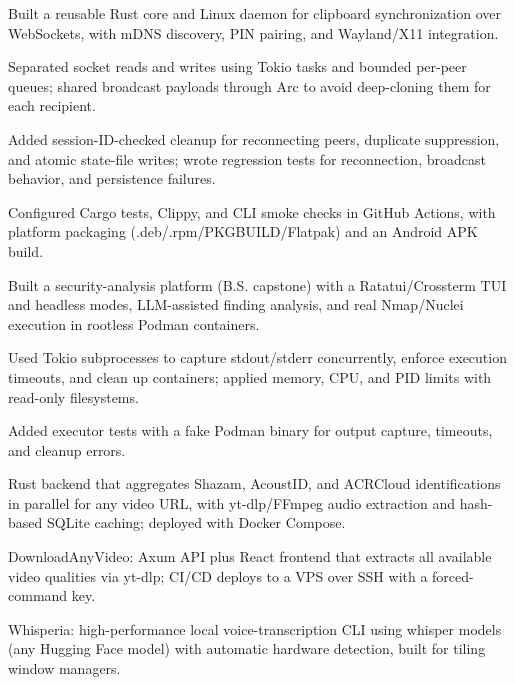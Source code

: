 \begin{cvbullets}
  \item Built a reusable Rust core and Linux daemon for clipboard synchronization over WebSockets, with mDNS discovery, PIN pairing, and Wayland/X11 integration.
  \item Separated socket reads and writes using Tokio tasks and bounded per-peer queues; shared broadcast payloads through Arc to avoid deep-cloning them for each recipient.
  \item Added session-ID-checked cleanup for reconnecting peers, duplicate suppression, and atomic state-file writes; wrote regression tests for reconnection, broadcast behavior, and persistence failures.
  \item Configured Cargo tests, Clippy, and CLI smoke checks in GitHub Actions, with platform packaging (.deb/.rpm/PKGBUILD/Flatpak) and an Android APK build.
\end{cvbullets}

\begin{cvbullets}
  \item Built a security-analysis platform (B.S. capstone) with a Ratatui/Crossterm TUI and headless modes, LLM-assisted finding analysis, and real Nmap/Nuclei execution in rootless Podman containers.
  \item Used Tokio subprocesses to capture stdout/stderr concurrently, enforce execution timeouts, and clean up containers; applied memory, CPU, and PID limits with read-only filesystems.
  \item Added executor tests with a fake Podman binary for output capture, timeouts, and cleanup errors.
\end{cvbullets}

\begin{cvbullets}
  \item Rust backend that aggregates Shazam, AcoustID, and ACRCloud identifications in parallel for any video URL, with yt-dlp/FFmpeg audio extraction and hash-based SQLite caching; deployed with Docker Compose.
\end{cvbullets}

\begin{cvbullets}
  \item DownloadAnyVideo: Axum API plus React frontend that extracts all available video qualities via yt-dlp; CI/CD deploys to a VPS over SSH with a forced-command key.
  \item Whisperia: high-performance local voice-transcription CLI using whisper models (any Hugging Face model) with automatic hardware detection, built for tiling window managers.
\end{cvbullets}

